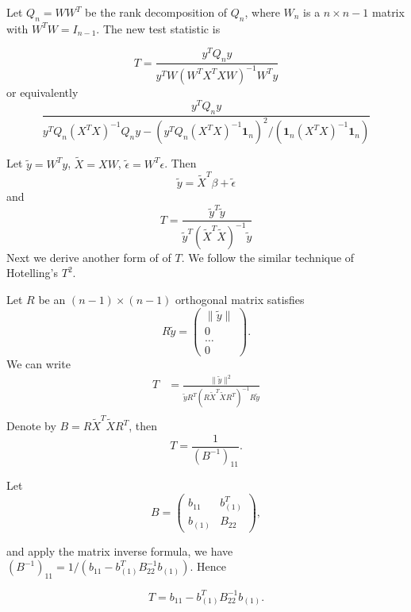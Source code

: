 \documentclass[review]{elsarticle}
\theoremstyle{plain}
\theoremstyle{definition}
\theoremstyle{remark}
\begin{document}
Let $Q_n=WW^T$ be the rank decomposition of $Q_n$, where $W_n$ is a $n\times n-1$ matrix with $W^T W=I_{n-1}$. The new test statistic is

\[
    T=\frac{y^T Q_n y}{
        y^T W(W^T X^T X W)^{-1}W^T y
    } 
    \]
or equivalently
\[
    \frac{y^T Q_n y}{
        y^T Q_n(X^T X)^{-1}Q_n y-(y^T Q_n(X^T X)^{-1}\textbf{1}_n)^2/(\textbf{1}_n(X^T X)^{-1}\textbf{1}_n)
    } 
    \]


Let $\tilde{y}=W^T y$, $\tilde{X}=XW$, $\tilde{\epsilon}=W^T \epsilon$. Then
\[
    \tilde{y}=\tilde{X}^T \beta + \tilde{\epsilon}
    \]
and
\[
    T=\frac{\tilde{y}^T \tilde{y}}{
        \tilde{y}^T{(\tilde{X}^T \tilde{X})}^{-1}\tilde{y}
    }
    \]
Next we derive another form of of $T$. We follow the similar technique of Hotelling's $T^2$.


Let $R$ be an $(n-1)\times (n-1)$ orthogonal matrix satisfies 
\[
    R\tilde{y}=
    \begin{pmatrix}
        \|\tilde{y}\|\\
        0\\
        \ldots\\
        0
    \end{pmatrix}.
    \]
We can write
    \begin{equation}\label{Tformula}
        \begin{aligned}
            T&=\frac{\|\tilde{y}\|^2
        }{\tilde{y}R^T{(R\tilde{X}^T\tilde{X}R^T)}^{-1}R\tilde{y}}\\
        \end{aligned}
    \end{equation}
Denote by $B=R\tilde{X}^T \tilde{X} R^T$, then
\[
    T=\frac{1}{(B^{-1})_{11}}.
    \]

Let
\[
    B=\begin{pmatrix} 
        b_{11} & b_{(1)}^T\\
        b_{(1)} & B_{22}
    \end{pmatrix},
    \]

and apply the matrix inverse formula, we have $(B^{-1})_{11}=1/(b_{11}-b_{(1)}^T B_{22}^{-1}b_{(1)})$. Hence

\[
   T= b_{11}-b_{(1)}^T B_{22}^{-1}b_{(1)}.
    \]
\end{document}
